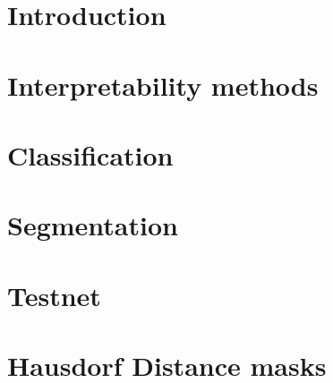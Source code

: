 \chapter{Introduction}


\chapter{Interpretability methods}








\chapter{Classification}







\chapter{Segmentation}










\chapter{Testnet}


\chapter{Hausdorf Distance masks}













